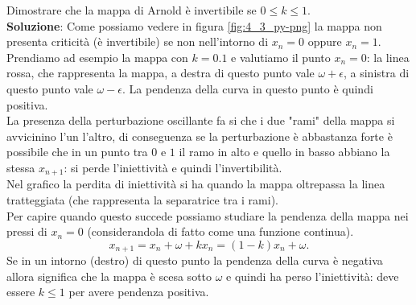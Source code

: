 \begin{ex}
       Dimostrare che la mappa di Arnold è invertibile se $0\le k\le 1$.\\
       \textbf{Soluzione}:
       Come possiamo vedere in figura \ref{fig:4_3_py-png} la mappa non presenta criticità (è invertibile) se non nell'intorno di $x_n=0$ oppure $x_n=1$. \\
       Prendiamo ad esempio la mappa con $k=0.1$ e valutiamo il punto $x_n=0$: la linea rossa, che rappresenta la mappa, a destra di questo punto vale $\omega+\epsilon$, a sinistra di questo punto vale $\omega-\epsilon$. La pendenza della curva in questo punto è quindi positiva.\\
       La presenza della perturbazione oscillante fa si che i due "rami" della mappa si avvicinino l'un l'altro, di conseguenza se la perturbazione è abbastanza forte è possibile che in un punto tra $0$ e $1$ il ramo in alto e quello in basso abbiano la stessa $x_{n+1}$: si perde l'iniettività e quindi l'invertibilità.\\
       Nel grafico la perdita di iniettività si ha quando la mappa oltrepassa la linea tratteggiata (che rappresenta la separatrice tra i rami).\\
       Per capire quando questo succede possiamo studiare la pendenza della mappa nei pressi di $x_n = 0$ (considerandola di fatto come una funzione continua).
       \[
	   x_{n+1} = x_n + \omega + k x_n = (1-k) x_n + \omega
       .\] 
       Se in un intorno (destro) di questo punto la pendenza della curva è negativa allora significa che la mappa è scesa sotto $\omega$ e quindi ha perso l'iniettività: deve essere $k\le 1$ per avere pendenza positiva.
\end{ex}
\noindent
